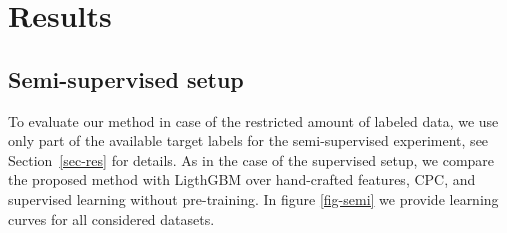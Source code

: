 \documentclass[sigconf, anonymous]{acmart}
\begin{document}
\section{Results} \label{app-sec-res}

\iffalse

\subsection{Semi-supervised setup} \label{app-sec-semi}

To evaluate our method in case of the restricted amount of labeled data, we use only part of the available target labels for the semi-supervised experiment, see Section~\ref{sec-res} for details. As in the case of the supervised setup, we compare the proposed method with LigthGBM over hand-crafted features, CPC, and supervised learning without pre-training. In figure \ref{fig-semi} we provide learning curves for all considered datasets.
\end{document}
